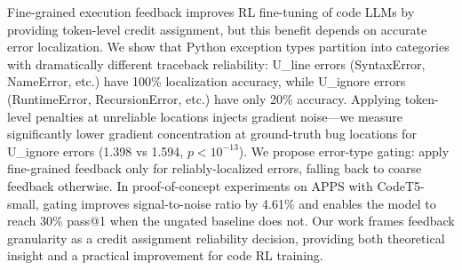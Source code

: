 Fine-grained execution feedback improves RL fine-tuning of code LLMs by providing token-level credit assignment, but this benefit depends on accurate error localization. We show that Python exception types partition into categories with dramatically different traceback reliability: U\_line errors (SyntaxError, NameError, etc.) have 100\% localization accuracy, while U\_ignore errors (RuntimeError, RecursionError, etc.) have only 20\% accuracy. Applying token-level penalties at unreliable locations injects gradient noise---we measure significantly lower gradient concentration at ground-truth bug locations for U\_ignore errors (1.398 vs 1.594, $p<10^{-13}$). We propose error-type gating: apply fine-grained feedback only for reliably-localized errors, falling back to coarse feedback otherwise. In proof-of-concept experiments on APPS with CodeT5-small, gating improves signal-to-noise ratio by 4.61\% and enables the model to reach 30\% pass@1 when the ungated baseline does not. Our work frames feedback granularity as a credit assignment reliability decision, providing both theoretical insight and a practical improvement for code RL training.
